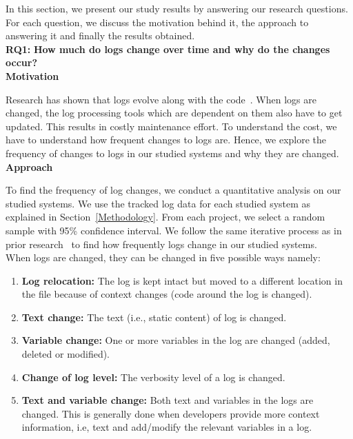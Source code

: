 In this section, we present our study results by answering our research questions. For each question, we discuss the motivation behind it, the approach to answering it and finally the results obtained. 
\\

\noindent\textbf{RQ1:} \textbf{How much do logs change over time and why do the changes occur?}
\\

\noindent\textbf{Motivation}

Research has shown that logs evolve along with the code~\cite{IanContextinformation}. When logs are changed, the log  processing tools which are dependent on them also have to get updated. This results in costly maintenance effort. To understand the cost, we have to understand how frequent changes to logs are. Hence, we explore the frequency of changes to logs in our studied systems and why they are changed.\\

\noindent \textbf{Approach}

To find the frequency of log changes, we conduct a quantitative analysis on our studied systems. We use the tracked log data for each studied system as explained in Section~\ref{Methodology}. From each project, we select a random sample with 95\% confidence interval. We follow the same iterative process as in prior research~\cite{IanIcesm} to find how frequently logs change in our studied systems. \\

When logs are changed, they can be changed in five possible ways namely:
\begin{enumerate}
	
	\item { \textbf{Log relocation:} } The log is kept intact but moved to a different location in the file because of context changes (code around the log is changed).
	
	\item \textbf{Text change:} The text (i.e., static content) of log is changed. 
	
	\item\textbf{Variable change:} One or more variables in the log are changed (added, deleted or modified).
	
	\item \textbf{Change of log level:} The verbosity level of a log is changed.
	
	\item  \textbf{Text and variable change:} Both text and variables in the logs are changed. This is generally done when developers provide more context information, i.e, text and add/modify the relevant variables in a log.
	
\end{enumerate}

